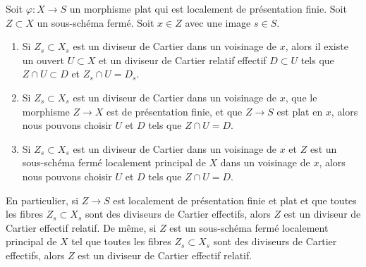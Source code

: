 \begin{lemma}
\label{lemma-fibre-Cartier}
Soit  $\varphi : X \to S$  un morphisme plat qui est localement de présentation finie. Soit
 $Z \subset X$  un sous-schéma fermé. Soit  $x \in Z$  avec une image  $s \in S$.
\begin{enumerate}
\item Si  $Z_s \subset X_s$  est un diviseur de Cartier dans un voisinage de  $x$,
alors il existe un ouvert  $U \subset X$  et un diviseur de Cartier relatif effectif
 $D \subset U$  tels que  $Z \cap U \subset D$  et  $Z_s \cap U = D_s$.
\item Si  $Z_s \subset X_s$  est un diviseur de Cartier dans un voisinage de  $x$, que
le morphisme  $Z \to X$  est de présentation finie, et que  $Z \to S$  est plat
en  $x$, alors nous pouvons choisir  $U$  et  $D$  tels que
 $Z \cap U = D$.
\item Si  $Z_s \subset X_s$  est un diviseur de Cartier dans un voisinage de  $x$  et
 $Z$  est un sous-schéma fermé localement principal de  $X$  dans un
voisinage de  $x$, alors nous pouvons choisir  $U$  et  $D$ 
tels que  $Z \cap U = D$.
\end{enumerate}
En particulier, si  $Z \to S$  est localement de présentation finie et plat et
que toutes les fibres  $Z_s \subset X_s$  sont des diviseurs de Cartier effectifs, alors
 $Z$  est un diviseur de Cartier effectif relatif. De même, si  $Z$ 
est un sous-schéma fermé localement principal de  $X$  tel que toutes les
fibres  $Z_s \subset X_s$  sont des diviseurs de Cartier effectifs, alors  $Z$ 
est un diviseur de Cartier effectif relatif.
\end{lemma}

